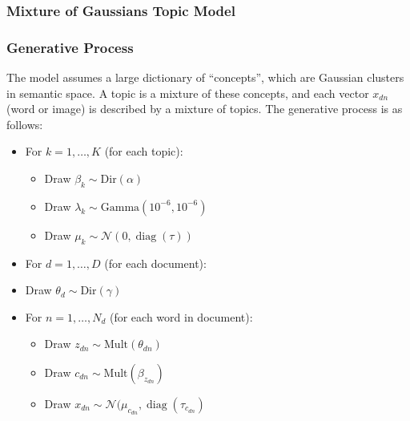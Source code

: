 \documentclass{beamer}
\DeclareMathOperator{\diag}{diag}
\begin{document}

\begin{frame}
  \frametitle{Mixture of Gaussians Topic Model}
\end{frame}

\begin{frame}
  \frametitle{Generative Process}
  The model assumes a large dictionary of ``concepts'', which are Gaussian clusters in semantic space. A topic is a mixture of these concepts, and each vector $x_{dn}$ (word or image) is described by a mixture of topics. The generative process is as follows:
  \begin{itemize}
    \item For $k = 1, \ldots, K$ (for each topic):
      \begin{itemize}
        \item Draw $\beta_k \sim \text{Dir}(\alpha)$
        \item Draw $\lambda_k \sim \text{Gamma}(10^{-6}, 10^{-6})$
        \item Draw $\mu_k \sim \mathcal{N}(0, \diag(\tau))$
      \end{itemize}
    \item For $d = 1, \ldots, D$ (for each document):
      \item Draw $\theta_d \sim \text{Dir}(\gamma)$
      \item For $n = 1, \ldots, N_d$ (for each word in document):
      \begin{itemize}
        \item Draw $z_{dn} \sim \text{Mult}(\theta_{dn})$
        \item Draw $c_{dn} \sim \text{Mult}(\beta_{z_{dn}})$
        \item Draw $x_{dn} \sim \mathcal{N}(\mu_{c_{dn}}, \diag(\tau_{c_{dn}})$
      \end{itemize}
  \end{itemize}
\end{frame}
\end{document}
